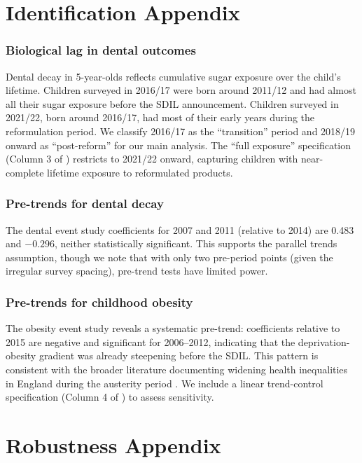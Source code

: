 \documentclass[12pt]{article}
\begin{document}
\section{Identification Appendix}
\label{sec:idappendix}

\subsubsection*{Biological lag in dental outcomes} Dental decay in 5-year-olds reflects cumulative sugar exposure over the child's lifetime. Children surveyed in 2016/17 were born around 2011/12 and had almost all their sugar exposure before the SDIL announcement. Children surveyed in 2021/22, born around 2016/17, had most of their early years during the reformulation period. We classify 2016/17 as the ``transition'' period and 2018/19 onward as ``post-reform'' for our main analysis. The ``full exposure'' specification (Column 3 of ) restricts to 2021/22 onward, capturing children with near-complete lifetime exposure to reformulated products.

\subsubsection*{Pre-trends for dental decay} The dental event study coefficients for 2007 and 2011 (relative to 2014) are 0.483 and $-0.296$, neither statistically significant. This supports the parallel trends assumption, though we note that with only two pre-period points (given the irregular survey spacing), pre-trend tests have limited power.

\subsubsection*{Pre-trends for childhood obesity} The obesity event study reveals a systematic pre-trend: coefficients relative to 2015 are negative and significant for 2006--2012, indicating that the deprivation-obesity gradient was already steepening before the SDIL. This pattern is consistent with the broader literature documenting widening health inequalities in England during the austerity period \citep{marmot2020, bambra2020}. We include a linear trend-control specification (Column 4 of ) to assess sensitivity.

\section{Robustness Appendix}
\label{sec:robustness}
\end{document}
